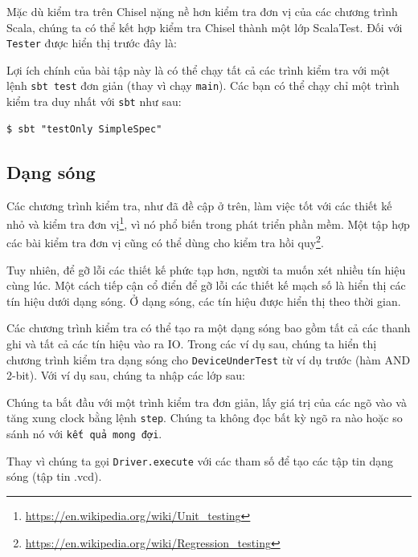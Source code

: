 \documentclass[%
    10pt,
    headinclude, footexclude,
    openright, %
    notitlepage,
    cleardoubleempty,
    headsepline,
    pointlessnumbers,
    bibtotoc, idxtotoc,
    ]{scrbook}
\newcommand{\code}[1]{{\small{\texttt{#1}}}}
\newcommand{\myref}[2]{\href{#1}{#2}}
\renewcommand{\myref}[2]{{#2}{\footnote{\url{#1}}}}
\begin{document}
\noindent Mặc dù kiểm tra trên Chisel nặng nề hơn kiểm tra đơn vị của các chương trình Scala, 
chúng ta có thể kết hợp kiểm tra Chisel thành một lớp ScalaTest. Đối với \code{Tester} được hiển thị trước đây là:


Lợi ích chính của bài tập này là có thể chạy tất cả các trình kiểm tra với một lệnh \code{sbt test} 
đơn giản (thay vì chạy \code{main}). Các bạn có thể chạy chỉ một trình kiểm tra duy nhất với \code{sbt} như sau:

\begin{verbatim}
$ sbt "testOnly SimpleSpec"
\end{verbatim}

\subsection{Dạng sóng}

Các chương trình kiểm tra, như đã đề cập ở trên, làm việc tốt với các thiết kế nhỏ và
\myref{https://en.wikipedia.org/wiki/Unit_testing}{kiểm tra đơn vị}, vì nó phổ biến trong phát 
triển phần mềm. Một tập hợp các bài kiểm tra đơn vị cũng có thể dùng cho
\myref{https://en.wikipedia.org/wiki/Regression_testing}{kiểm tra hồi quy}.

Tuy nhiên, để gỡ lỗi các thiết kế phức tạp hơn, người ta muốn xét nhiều tín hiệu cùng lúc. 
Một cách tiếp cận cổ điển để gỡ lỗi các thiết kế mạch số là hiển thị 
các tín hiệu dưới dạng sóng. Ở dạng sóng, các tín hiệu được hiển thị theo thời gian.

Các chương trình kiểm tra có thể tạo ra một dạng sóng bao gồm tất cả các thanh ghi và tất cả các tín hiệu vào ra IO. 
Trong các ví dụ sau, chúng ta hiển thị chương trình kiểm tra dạng sóng cho \code{DeviceUnderTest} 
từ ví dụ trước (hàm AND 2-bit). Với ví dụ sau, chúng ta nhập các lớp sau:


\noindent Chúng ta bắt đầu với một trình kiểm tra đơn giản, lấy giá trị của các ngõ vào và tăng xung clock 
bằng lệnh \code{step}. Chúng ta không đọc bất kỳ ngõ ra nào hoặc so sánh nó với \code{kết quả mong đợi}.


\noindent Thay vì chúng ta gọi \code{Driver.execute} với các tham số để tạo các tập tin dạng sóng (tập tin .vcd).

\end{document}
